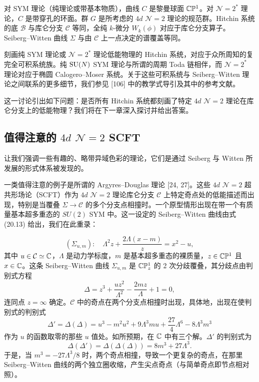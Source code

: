 \begin{example}[20.40]
对 SYM 理论（纯理论或带基本物质），曲线 $C$ 是黎曼球面 $\mathbb{C}\mathbb{P}^1$。对 $\mathcal{N}=2^*$ 理论，$C$ 是带穿孔的环面。群 $G$ 是所考虑的 $4d$ $\mathcal{N}=2$ 理论的规范群。Hitchin 系统的底 $\mathcal{B}$ 与库仑分支 $\mathcal{C}$ 等同，全纯 $k$-微分 $W_k(\phi)$ 对应于库仑分支算子。Seiberg–Witten 曲线 $\Sigma$ 与由 $\mathcal{C}$ 上一点决定的谱覆盖等同。
\end{example}

刻画纯 SYM 理论或 $\mathcal{N}=2^*$ 理论低能物理的 Hitchin 系统，对应于众所周知的复完全可积系统族。纯 $\operatorname{SU}(N)$ SYM 理论与所谓的周期 Toda 链相伴，而 $\mathcal{N}=2^*$ 理论对应于椭圆 Calogero–Moser 系统。关于这些可积系统与 Seiberg–Witten 理论之间联系的更多细节，我们参见 [106] 中的教学式导引及其中的参考文献。

\begin{remark}[20.41]
这一讨论引出如下问题：是否所有 Hitchin 系统都刻画了特定 $4d$ $\mathcal{N}=2$ 理论在库仑分支上的低能物理？我们将在下一章深入探讨并给出答案。
\end{remark}

\subsection{值得注意的 $4d$ $\mathcal{N}=2$ SCFT}

让我们强调一些有趣的、略带异域色彩的理论，它们是通过 Seiberg 与 Witten 所发展的形式体系被发现的。

一类值得注意的例子是所谓的 Argyres–Douglas 理论 [24, 27]。这些 $4d$ $\mathcal{N}=2$ 超共形场论（SCFT）作为 $4d$ $\mathcal{N}=2$ 理论库仑分支 $\mathcal{C}$ 上特定奇点处的低能描述而出现，特别是当覆叠 $\Sigma\to\mathcal{C}$ 的多个分支点相撞时。一个原型情形出现在带一个有质量基本超多重态的 $SU(2)$ SYM 中。这一设定的 Seiberg–Witten 曲线由式 (20.13) 给出，我们在此重录：

\[
(\Sigma_{u,m}):\quad \Lambda^2 z+\frac{2\Lambda(x-m)}{z}=x^2-u,
\]
其中 $u\in\mathcal{C}\simeq\mathbb{C}$，$\Lambda$ 是动力学标度，$m$ 是基本超多重态的裸质量，$z\in\mathbb{C}\mathbb{P}^1$ 且 $x\in\mathbb{C}$。这条 Seiberg–Witten 曲线 $\Sigma_{u,m}$ 是 $\mathbb{C}\mathbb{P}^1_z$ 的 2 次分歧覆叠，其分歧点由判别式方程
\[
\Delta=z^3+\frac{uz^2}{\Lambda^2}-\frac{2mz}{\Lambda}+1=0,
\]
连同点 $z=\infty$ 确定。$\mathcal{C}$ 中的奇点在两个分支点相撞时出现，具体地，出现在使判别式的判别式
\[
\Delta'=\Delta(\Delta)=u^3-m^2u^2+9\Lambda^3mu+\frac{27}{4}\Lambda^6-8\Lambda^3m^3
\]
作为 $u$ 的函数取零的那些 $u$ 值处。如所预期，在 $\mathbb{C}$ 中有三个解。$\Delta'$ 的判别式为
\[
\Delta(\Delta')=\Delta(\Delta(\Delta))=8m^3+27\Lambda^3.
\]
于是，当 $m^3=-27\Lambda^3/8$ 时，两个奇点相撞，导致一个更复杂的奇点，在那里 Seiberg–Witten 曲线的两个独立圈收缩，产生尖点奇点（与简单奇点即节点相对照）。

